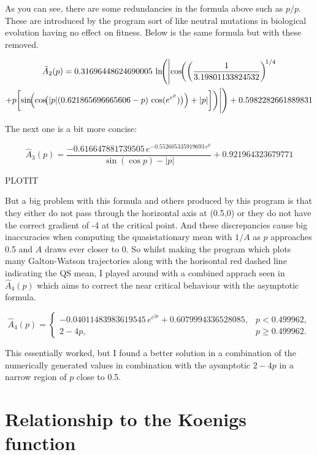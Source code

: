 \documentclass[11pt,a4paper]{article}
\theoremstyle{plain}
\theoremstyle{definition}
\begin{document}
\noindent
As you can see, there are some redundancies in the formula above such as $p/p$. These are introduced by the program sort of like neutral mutations in biological evolution having no effect on fitness. Below is the same formula but with these removed.

\begin{multline*}
\hat A_2(p) = 0.31696448624690005 \,
\ln\!\Biggl(
\Biggl|
\cos\!\biggl(
\left( \frac{1}{3.19801133824532} \right)^{\!1/4} \\
+
p \biggl[
\sin\!\Bigl(
\cos\!\bigl(
|p| (0.621865696665606 - p)\,
\cos(e^{e^{p}})
\bigr)
\Bigr)
+
|p|
\biggr]
\biggr)
\Biggr|
\Biggr)
+ 0.5982282661889831
\end{multline*}

\noindent
The next one is a bit more concise:

\[
\hat A_3(p)  = \frac{-0.616647881739505 \, e^{-0.552605335919693 \, e^p}}{\sin(\cos p) - |p|} + 0.921964323679771
\]

PLOTIT

\noindent
But a big problem with this formula and others produced by this program is that they either do not pass through the horizontal axis at (0.5,0) or they do not have the correct gradient of -4 at the critical point. And these discrepancies cause big inaccuracies when computing the quasistationary mean with $1/A$ as $p$ approaches 0.5 and $A$ draws ever closer to 0. So whilst making the program which plots many Galton-Watson trajectories along with the horisontal red dashed line indicating the QS mean, I played around with a combined apprach seen in $\hat A_4(p)$ which aims to correct the near critical behaviour with the asymptotic formula. 


\[
\hat A_4(p) = 
\begin{cases}
-0.04011483983619545\, e^{e^{2p}} + 0.6079994336528085, & p < 0.499962,\\[2mm]
2 - 4p, & p \ge 0.499962.
\end{cases}
\]


\noindent
This essentially worked, but I found a better solution in a combination of the numerically generated values in combination with the aysmptotic $2-4p$ in a narrow region of $p$ close to 0.5.



\section{Relationship to the Koenigs function}
\label{sec:koenigs-link}
\end{document}
